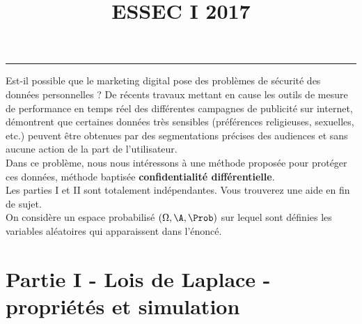 \documentclass[11pt]{article}%
\title{\bf \vspace{-1.6cm} ESSEC I 2017} %
\author{} %
\date{} %
\begin{document}
\maketitle %
\vspace{-1.2cm}\hrule %
\thispagestyle{fancy}

\vspace*{.4cm}


\noindent
Est-il possible que le marketing digital pose des problèmes de
sécurité des données personnelles ? De récents travaux %
mettant en cause les outils de mesure de performance en temps réel des
différentes campagnes de publicité sur internet, démontrent que
certaines données très sensibles (préférences religieuses, sexuelles,
etc.) peuvent être obtenues par des segmentations précises des
audiences et sans aucune action de la part de l'utilisateur.\\[.2cm]
Dans ce problème, nous nous intéressons à une méthode proposée pour
protéger ces données, méthode baptisée {\bf confidentialité
  différentielle}.\\[.2cm]
Les parties I et II sont totalement indépendantes. Vous trouverez une
aide \Scilab{} en fin de sujet.\\[.2cm]
On considère un espace probabilisé $(\Omega, \A , \Prob)$ sur lequel
sont définies les variables aléatoires qui apparaissent dans l'énoncé.

\section*{Partie I - Lois de Laplace - propriétés et simulation}
\end{document}
